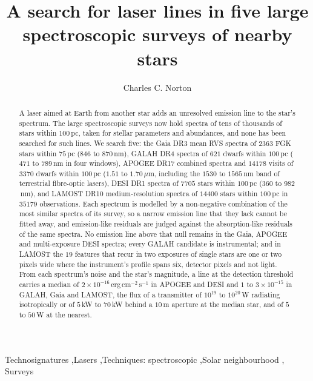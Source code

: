 \documentclass[3p,11pt]{elsarticle}
\newcommand{\um}{\,$\mu$m}
\begin{document}
\begin{frontmatter}

\title{A search for laser lines in five large spectroscopic surveys of nearby stars}

\author{Charles C. Norton}

\begin{abstract}
A laser aimed at Earth from another star adds an unresolved emission line to the
star's spectrum. The large spectroscopic surveys now hold spectra of tens of thousands of
stars within $100$\,pc, taken for stellar parameters and abundances, and none has been
searched for such lines. We search five: the Gaia DR3 mean RVS spectra of $2363$ FGK
stars within $75$\,pc ($846$ to $870$\,nm), GALAH DR4 spectra of $621$ dwarfs within
$100$\,pc ($471$ to $789$\,nm in four windows), APOGEE DR17 combined spectra and
$14178$ visits of $3370$ dwarfs within $100$\,pc ($1.51$ to $1.70$\um, including the
$1530$ to $1565$\,nm band of terrestrial fibre-optic lasers), DESI DR1 spectra of $7705$
stars within $100$\,pc ($360$ to $982$\,nm), and LAMOST DR10 medium-resolution spectra
of $14400$ stars within $100$\,pc in $35179$ observations. Each spectrum is modelled by a
non-negative combination of the most similar spectra of its survey, so a narrow emission
line that they lack cannot be fitted away, and emission-like residuals are judged against
the absorption-like residuals of the same spectra. No emission line above that null
remains in the Gaia, APOGEE and multi-exposure DESI spectra; every GALAH candidate is
instrumental; and in LAMOST the $19$ features that recur in two exposures of single
stars are one or two pixels wide where the instrument's profile spans six, detector
pixels and not light. From each spectrum's noise and the star's magnitude, a line at the
detection threshold carries a median of $2\times10^{-16}$\,erg\,cm$^{-2}$\,s$^{-1}$ in
APOGEE and DESI and $1$ to $3\times10^{-15}$ in GALAH, Gaia and LAMOST, the flux of a
transmitter of $10^{19}$ to $10^{20}$\,W radiating isotropically or of $5$\,kW to
$70$\,kW behind a $10$\,m aperture at the median star, and of $5$ to $50$\,W at the
nearest.
\end{abstract}

\begin{keyword}
Technosignatures \sep Lasers \sep Techniques: spectroscopic \sep Solar neighbourhood \sep
Surveys
\end{keyword}

\end{frontmatter}
\end{document}
